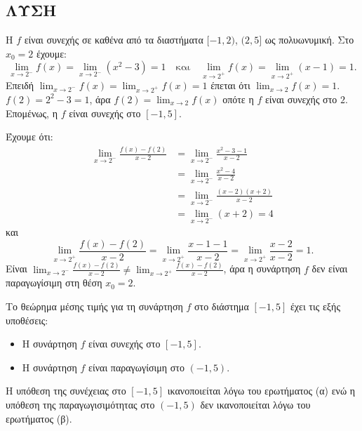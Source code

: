 \subsection*{ΛΥΣΗ}
\begin{alist}
    \item Η $f$ είναι συνεχής σε καθένα από τα διαστήματα $[-1,2)$, $(2,5]$ ως πολυωνυμική.
    \medskip
    Στο $x_0 = 2$ έχουμε:
    \[
    \lim_{x \to 2^-} f(x) = \lim_{x \to 2^-} (x^2 - 3) = 1 \quad \text{και} \quad \lim_{x \to 2^+} f(x) = \lim_{x \to 2^+} (x - 1) = 1.
    \]
    Επειδή $\lim_{x \to 2^-} f(x) = \lim_{x \to 2^+} f(x) = 1$ έπεται ότι $\lim_{x \to 2} f(x) = 1$.
    \medskip
    $f(2) = 2^2 - 3 = 1$, άρα $f(2) = \lim_{x \to 2} f(x)$ οπότε η $f$ είναι συνεχής στο $2$.
    \medskip
    Επομένως, η $f$ είναι συνεχής στο $[-1,5]$.

    \item Έχουμε ότι:
    \begin{align*}
    \lim_{x \to 2^-} \frac{f(x) - f(2)}{x - 2} &= \lim_{x \to 2^-} \frac{x^2 - 3 - 1}{x - 2} \\
    &= \lim_{x \to 2^-} \frac{x^2 - 4}{x - 2} \\
    &= \lim_{x \to 2^-} \frac{(x-2)(x+2)}{x - 2} \\
    &= \lim_{x \to 2^-} (x+2) = 4
    \end{align*}
    και
    \[
    \lim_{x \to 2^+} \frac{f(x) - f(2)}{x - 2} = \lim_{x \to 2^+} \frac{x - 1 - 1}{x - 2} = \lim_{x \to 2^+} \frac{x - 2}{x - 2} = 1.
    \]
    Είναι $\lim_{x \to 2^-} \frac{f(x) - f(2)}{x - 2} \neq \lim_{x \to 2^+} \frac{f(x) - f(2)}{x - 2}$, άρα η συνάρτηση $f$ δεν είναι παραγωγίσιμη στη θέση $x_0=2$.

    \item Το θεώρημα μέσης τιμής για τη συνάρτηση $f$ στο διάστημα $[-1,5]$ έχει τις εξής υποθέσεις:
    \begin{itemize}
        \item Η συνάρτηση $f$ είναι συνεχής στο $[-1,5]$.
        \item Η συνάρτηση $f$ είναι παραγωγίσιμη στο $(-1,5)$.
    \end{itemize}
    Η υπόθεση της συνέχειας στο $[-1,5]$ ικανοποιείται λόγω του ερωτήματος (α) ενώ η υπόθεση της παραγωγισιμότητας στο $(-1,5)$ δεν ικανοποιείται λόγω του ερωτήματος (β).
\end{alist}